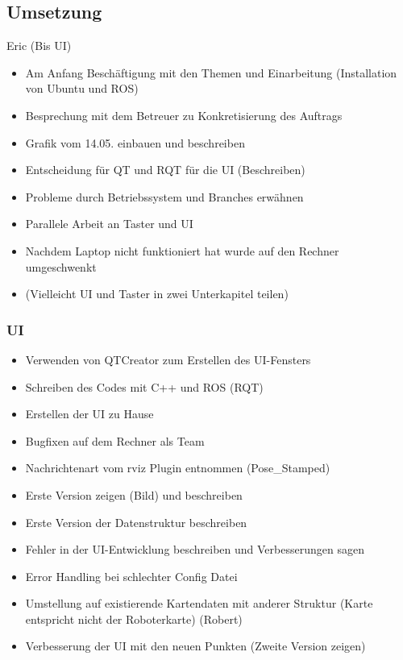 \documentclass[a4paper,12pt,headsepline]{scrartcl}
\begin{document}
	\subsection{Umsetzung}
		Eric (Bis UI)\\
		\begin{itemize}
			\item Am Anfang Beschäftigung mit den Themen und Einarbeitung (Installation von Ubuntu und ROS)
			\item Besprechung mit dem Betreuer zu Konkretisierung des Auftrags
			\item Grafik vom 14.05. einbauen und beschreiben 
			\item Entscheidung für QT und RQT für die UI (Beschreiben)
			\item Probleme durch Betriebssystem und Branches erwähnen
			\item Parallele Arbeit an Taster und UI
			\item Nachdem Laptop nicht funktioniert hat wurde auf den Rechner umgeschwenkt
			\item (Vielleicht UI und Taster in zwei Unterkapitel teilen)
		\end{itemize}
			\subsubsection{UI}
			\begin{itemize}
				\item Verwenden von QTCreator zum Erstellen des UI-Fensters
				\item Schreiben des Codes mit C++ und ROS (RQT)
				\item Erstellen der UI zu Hause
				\item Bugfixen auf dem Rechner als Team
				\item Nachrichtenart vom rviz Plugin entnommen (Pose{\_}Stamped)
				\item Erste Version zeigen (Bild) und beschreiben
				\item Erste Version der Datenstruktur beschreiben
				\item Fehler in der UI-Entwicklung beschreiben und Verbesserungen sagen
				\item Error Handling bei schlechter Config Datei
				\item Umstellung auf existierende Kartendaten mit anderer Struktur (Karte entspricht nicht der Roboterkarte) (Robert)
				\item Verbesserung der UI mit den neuen Punkten (Zweite Version zeigen)
			\end{itemize}
			
\end{document}
